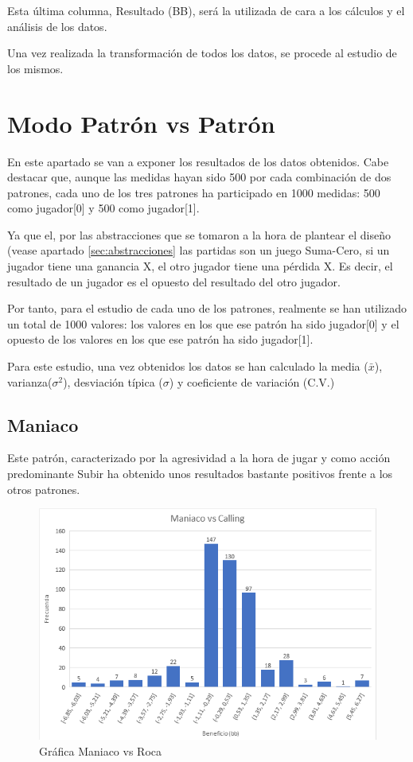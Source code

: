 Esta última columna, Resultado (BB), será la utilizada de cara a los cálculos y el análisis de los datos.

Una vez realizada la transformación de todos los datos, se procede al estudio de los mismos.

\section{Modo Patrón vs Patrón}
\label{sec:pvp}

En este apartado se van a exponer los resultados de los datos obtenidos. Cabe destacar que, aunque las medidas hayan sido 500 por cada combinación de dos patrones, cada uno de los tres patrones ha participado en 1000 medidas: 500 como jugador[0] y 500 como jugador[1].

Ya que el, por las abstracciones que se tomaron a la hora de plantear el diseño (vease apartado \ref{sec:abstracciones} las partidas son un juego Suma-Cero, si un jugador tiene una ganancia X, el otro jugador tiene una pérdida X. Es decir, el resultado de un jugador es el opuesto del resultado del otro jugador.

Por tanto, para el estudio de cada uno de los patrones, realmente se han utilizado un total de 1000 valores: los valores en los que ese patrón ha sido jugador[0] y el opuesto de los valores en los que ese patrón ha sido jugador[1].

Para este estudio, una vez obtenidos los datos se han calculado la media ($\bar{x}$), varianza($\sigma^2$), desviación típica ($\sigma$) y coeficiente de variación (C.V.)

\subsection{Maniaco}

Este patrón, caracterizado por la agresividad a la hora de jugar y como acción predominante Subir ha obtenido unos resultados bastante positivos frente a los otros patrones.



\begin{figure}[h]
\centering
\includegraphics[width=1\textwidth]{figuras/MvR.png}   
\caption{Gráfica Maniaco vs Roca}
\label{fig:MvR}
\end{figure}

